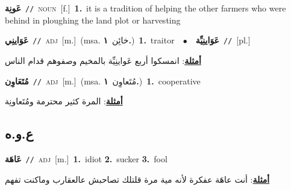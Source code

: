 \documentclass[10pt,a4paper,twoside]{article} %
\begin{document}
\begin{multicols}{2}
{\setlength\topsep{0pt}\textbf{\foreignlanguage{arabic}{عَونِة}}\ {\color{gray}\texttt{//}\color{black}}\ \textsc{noun}\ [f.]\ \textbf{1.}~it is a tradition of helping the other farmers who were behind in ploughing the land plot or harvesting\ } \vspace{2mm}

{\setlength\topsep{0pt}\textbf{\foreignlanguage{arabic}{عَوَاينِي}}\ {\color{gray}\texttt{//}\color{black}}\ \textsc{adj}\ [m.]\ \color{gray}(msa. \foreignlanguage{arabic}{خائِن}~\foreignlanguage{arabic}{\textbf{١.}})\color{black}\ \textbf{1.}~traitor\ \ $\bullet$\ \ \setlength\topsep{0pt}\textbf{\foreignlanguage{arabic}{عَوَاينِيِّة}}\ {\color{gray}\texttt{//}\color{black}}\ [pl.]\  \begin{flushright}\color{gray}\foreignlanguage{arabic}{\textbf{\underline{\foreignlanguage{arabic}{أمثلة}}}: انمسكوا أربع عَواينِيِّة بالمخيم وصفوهم قدام الناس}\end{flushright}\color{black}} \vspace{2mm}

{\setlength\topsep{0pt}\textbf{\foreignlanguage{arabic}{مُتَعَاوِن}}\ {\color{gray}\texttt{//}\color{black}}\ \textsc{adj}\ [m.]\ \color{gray}(msa. \foreignlanguage{arabic}{مُتَعاوِن}~\foreignlanguage{arabic}{\textbf{١.}})\color{black}\ \textbf{1.}~cooperative\  \begin{flushright}\color{gray}\foreignlanguage{arabic}{\textbf{\underline{\foreignlanguage{arabic}{أمثلة}}}: المرة كثير محترمة ومُتَعاونِة}\end{flushright}\color{black}} \vspace{2mm}

\vspace{-3mm}
\subsection*{\color{blue}\foreignlanguage{arabic}{ع.و.ه}\color{blue}{}} 

{\setlength\topsep{0pt}\textbf{\foreignlanguage{arabic}{عَاهَة}}\ {\color{gray}\texttt{//}\color{black}}\ \textsc{adj}\ [m.]\ \textbf{1.}~idiot  \textbf{2.}~sucker  \textbf{3.}~fool\  \begin{flushright}\color{gray}\foreignlanguage{arabic}{\textbf{\underline{\foreignlanguage{arabic}{أمثلة}}}: أنت عاهَة عفكرة لأنه مية مرة قلتلك تصاحبش عالعقارب وماكنت تفهم}\end{flushright}\color{black}} \vspace{2mm}


\end{multicols}
\end{document}
